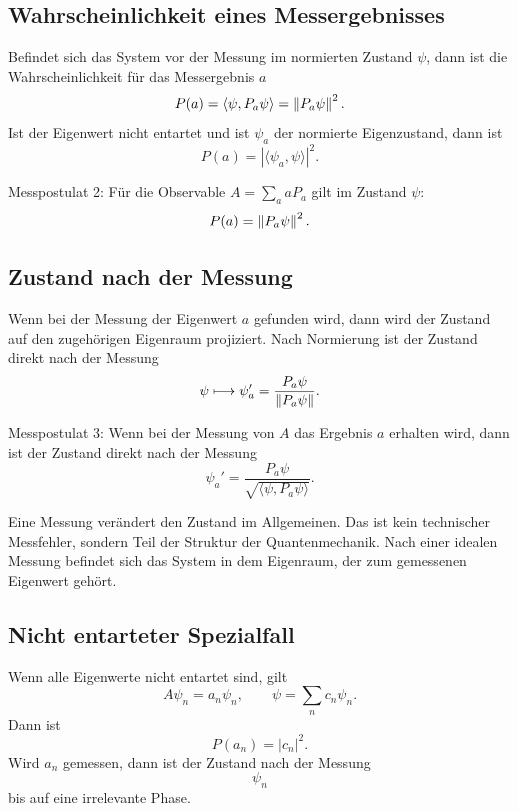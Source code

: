 \subsection{Wahrscheinlichkeit eines Messergebnisses}

Befindet sich das System vor der Messung im normierten Zustand $\psi$, dann ist die Wahrscheinlichkeit für das Messergebnis $a$
\[
    P(a)=\langle\psi,P_a\psi\rangle=\left\lVert P_a\psi \right\rVert^2.
\]
Ist der Eigenwert nicht entartet und ist $\psi_a$ der normierte Eigenzustand, dann ist
\[
    P(a)=|\langle\psi_a,\psi\rangle|^2.
\]

\begin{formulabox}
Messpostulat 2:
Für die Observable $A=\sum_a aP_a$ gilt im Zustand $\psi$:
\[
    P(a)=\left\lVert P_a\psi \right\rVert^2.
\]
\end{formulabox}

\subsection{Zustand nach der Messung}

Wenn bei der Messung der Eigenwert $a$ gefunden wird, dann wird der Zustand auf den zugehörigen Eigenraum projiziert. Nach Normierung ist der Zustand direkt nach der Messung
\[
    \psi\longmapsto \psi_a'=\frac{P_a\psi}{\left\lVert P_a\psi \right\rVert}.
\]

\begin{formulabox}
Messpostulat 3:
Wenn bei der Messung von $A$ das Ergebnis $a$ erhalten wird, dann ist der Zustand direkt nach der Messung
\[
    \psi_a'=\frac{P_a\psi}{\sqrt{\langle\psi,P_a\psi\rangle}}.
\]
\end{formulabox}

\begin{conceptbox}
Eine Messung verändert den Zustand im Allgemeinen. Das ist kein technischer Messfehler, sondern Teil der Struktur der Quantenmechanik. Nach einer idealen Messung befindet sich das System in dem Eigenraum, der zum gemessenen Eigenwert gehört.
\end{conceptbox}

\subsection{Nicht entarteter Spezialfall}

Wenn alle Eigenwerte nicht entartet sind, gilt
\[
    A\psi_n=a_n\psi_n,
    \qquad
    \psi=\sum_n c_n\psi_n.
\]
Dann ist
\[
    P(a_n)=|c_n|^2.
\]
Wird $a_n$ gemessen, dann ist der Zustand nach der Messung
\[
    \psi_n
\]
bis auf eine irrelevante Phase.

